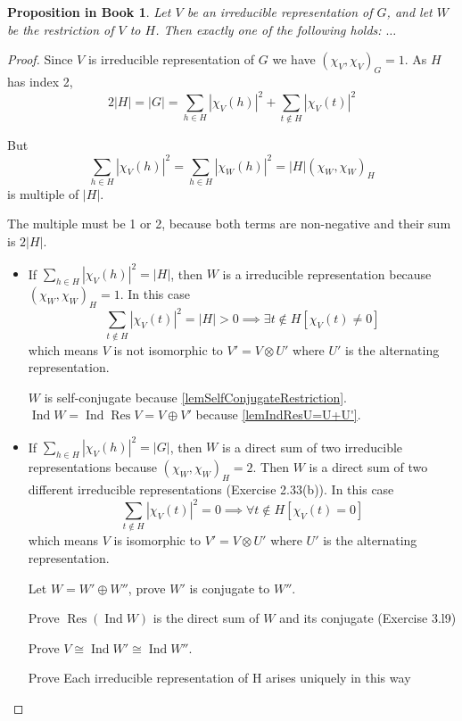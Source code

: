 \documentclass[12pt, letterpaper]{article}
\newcommand{\Res}{\operatorname{Res}}
\newcommand{\Ind}{\operatorname{Ind}}
\newcommand{\red}[1]{{\color{red} #1}}
\newcommand{\abs}[1]{\left\lvert #1 \right\rvert}
\newcommand{\card}[1]{\left\lvert #1 \right\rvert}
\theoremstyle{definition}
\theoremstyle{remark}
\theoremstyle{definition}
\theoremstyle{plain}
\newtheorem{pprop}[exe]{Proposition in Book}
\numberwithin{equation}{section}
\begin{document}
	\begin{pprop}
		Let $V$ be an irreducible representation of $G$, and let $W$
		be the restriction of $V$ to $H$. Then exactly one of the following holds:
		$\dots$
	\end{pprop}
	\begin{proof}
		Since $V$ is irreducible representation of $G$
		we have $(\chi_V,\chi_V)_G=1$.
		As $H$ has index 2,
		\[2\card{H}=\card{G}=\sum_{h\in H}\abs{\chi_V(h)}^2+\sum_{t\notin H}\abs{\chi_V(t)}^2 \]
		
		But
		\[\sum_{h\in H}\abs{\chi_V(h)}^2=\sum_{h\in H}\abs{\chi_W(h)}^2=\card{H}(\chi_W,\chi_W)_H\]
		is multiple of $\card{H}$.

		The multiple must be 1 or 2, because both terms are non-negative and their sum is $2\card{H}$.
		
		\begin{itemize}
			\item If $\sum_{h\in H}\abs{\chi_V(h)}^2=\card{H}$, then $W$ is a irreducible representation 
			because $(\chi_W,\chi_W)_H=1$. In this case 
			\[\sum_{t\notin H}\abs{\chi_V(t)}^2=\card{H}>0\implies 
			\exists t\notin H[\chi_V(t)\ne 0]\]
			which means $V$ is not isomorphic to $V'=V\otimes U'$ where $U'$ is the alternating representation.
			
			$W$ is self-conjugate because \ref{lemSelfConjugateRestriction}.
			$\Ind W=\Ind \Res V=V\oplus V'$ because \ref{lemIndResU=U+U'}.
			
			\item If $\sum_{h\in H}\abs{\chi_V(h)}^2=\card{G}$, then $W$ is a direct sum of two irreducible representations 
			because $(\chi_W,\chi_W)_H=2$. Then $W$ is a direct sum of two different irreducible representations
			(Exercise 2.33(b)).
			In this case 
			\[\sum_{t\notin H}\abs{\chi_V(t)}^2=0\implies 
			\forall  t\notin H[\chi_V(t)=0]\]
			which means $V$ is isomorphic to $V'=V\otimes U'$ where $U'$ is the alternating representation.
			
			Let $W=W'\oplus W''$, \red{prove $W'$ is conjugate to $W''$.}
			
			\red{Prove $\Res(\Ind W)$ is the direct sum of $W$ and its conjugate (Exercise 3.l9)}
			
			\red{Prove $V\cong \Ind W' \cong \Ind W''$.}
			
			\red{Prove Each irreducible representation of H arises uniquely in this way}
		\end{itemize}
	\end{proof}
\end{document}
